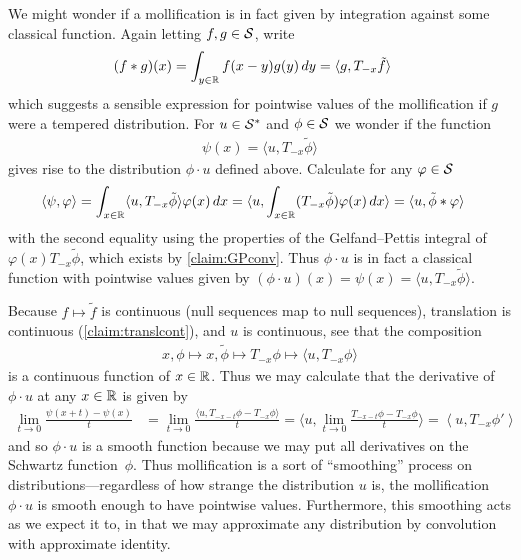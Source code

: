     We might wonder if a mollification is in fact given by integration against some classical function.
    Again letting $f,g\in\S$, write
    \begin{align*}
      (f*g)(x)
      &= \int_{y\in\R} f(x-y)g(y)\,dy
      = \langle g, T_{-x}\tilde f\rangle
    \end{align*}
    which suggests a sensible expression for pointwise values of the mollification if $g$ were a tempered distribution.
    For $u\in\SS$ and $\phi\in\S$ we wonder if the function
    \begin{align*}
      \psi(x) = \langle u, T_{-x}\tilde\phi\rangle
    \end{align*}
    gives rise to the distribution $\phi\cdot u$ defined above.
    Calculate for any $\varphi\in\S$
    \begin{align*}
      \langle \psi, \varphi \rangle
      &= \int_{x\in\R} \langle u,T_{-x}\tilde\phi\rangle\varphi(x)\,dx
      = \langle u, \int_{x\in\R} (T_{-x}\tilde\phi)\varphi(x)\,dx \rangle
      = \langle u, \tilde\phi*\varphi\rangle
    \end{align*}
    with the second equality using the properties of the Gelfand--Pettis integral of $\varphi(x)T_{-x}\tilde\phi$, which exists by \cref{claim:GPconv}.
    Thus $\phi\cdot u$ is in fact a classical function with pointwise values given by $(\phi\cdot u)(x)=\psi(x)=\langle u, T_{-x}\tilde\phi\rangle$.

    Because $f\mapsto\tilde f$ is continuous (null sequences map to null sequences), translation is continuous (\cref{claim:translcont}), and $u$ is continuous, see that the composition
    \begin{align*}
      x, \phi \mapsto x, \tilde\phi \mapsto T_{-x}\phi \mapsto \langle u, T_{-x}\phi \rangle
    \end{align*}
    is a continuous function of $x\in\R$.
    Thus we may calculate that the derivative of $\phi\cdot u$ at any $x\in\R$ is given by
    \begin{align*}
      \lim_{t\rightarrow0} \frac{\psi(x+t) - \psi(x)}{t}
      &= \lim_{t\rightarrow0} \frac{\langle u, T_{-x-t}\phi-T_{-x}\phi\rangle}{t}
      = \langle u, \lim_{t\rightarrow0} \frac{T_{-x-t}\phi-T_{-x}\phi}{t} \rangle
      = \left\langle u, T_{-x}\phi'\right\rangle
    \end{align*}
    and so $\phi\cdot u$ is a smooth function because we may put all derivatives on the Schwartz function~$\phi$.
    Thus mollification is a sort of ``smoothing'' process on distributions---regardless of how strange the distribution $u$ is, the mollification $\phi\cdot u$ is smooth enough to have pointwise values.
    Furthermore, this smoothing acts as we expect it to, in that we may approximate any distribution by convolution with approximate identity. 

